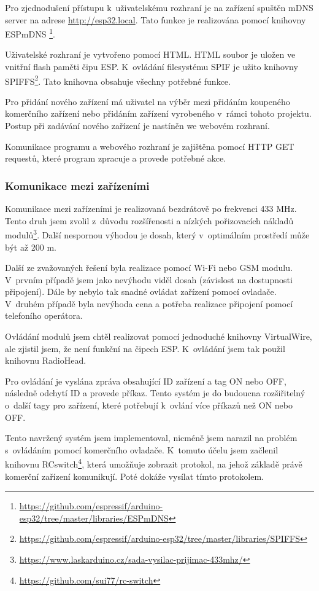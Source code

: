 \documentclass[11pt,a4paper,twoside,openright]{report}
\begin{document}
	
	Pro zjednodušení přístupu k~uživatelskému rozhraní je na zařízení spuštěn mDNS server na adrese \url{http://esp32.local}. Tato funkce je realizována pomocí knihovny ESPmDNS \footnote{\url{https://github.com/espressif/arduino-esp32/tree/master/libraries/ESPmDNS}}.
	
	
	Uživatelské rozhraní je vytvořeno pomocí HTML. HTML soubor je uložen ve vnitřní flash paměti čipu ESP. K~ovládání filesystému SPIF je užito knihovny SPIFFS\footnote{\url{https://github.com/espressif/arduino-esp32/tree/master/libraries/SPIFFS}}. Tato knihovna obsahuje všechny potřebné funkce.
	
	
	Pro přidání nového zařízení má uživatel na výběr mezi přidáním koupeného komerčního zařízení nebo přidáním zařízení vyrobeného v~rámci tohoto projektu. Postup při zadávání nového zařízení je nastíněn we webovém rozhraní.
	
	
	Komunikace programu a webového rozhraní je zajištěna pomocí HTTP GET requestů, které program zpracuje a provede potřebné akce. 
	
	
	\subsubsection{Komunikace mezi zařízeními}
	
	Komunikace mezi zařízeními je realizovaná bezdrátově po frekvenci 433 MHz. Tento druh jsem zvolil z~důvodu rozšířenosti a nízkých pořizovacích nákladů modulů\footnote{\url{https://www.laskarduino.cz/sada-vysilac-prijimac-433mhz/}}. Další nespornou výhodou je dosah, který v~optimálním prostředí může být až 200 m.
	
	
	Další ze zvažovaných řešení byla realizace pomocí Wi-Fi nebo GSM modulu. V~prvním případě jsem jako nevýhodu viděl dosah (závislost na dostupnosti připojení). Dále by nebylo tak snadné ovládat zařízení pomocí ovladače. V~druhém případě byla nevýhoda cena a potřeba realizace připojení pomocí telefoního operátora.
	
	
	Ovládání modulů jsem chtěl realizovat pomocí jednoduché knihovny VirtualWire, ale zjistil jsem, že není funkční na čipech ESP. K~ovládání jsem tak použil knihovnu RadioHead. 
	
	
	Pro ovládání  je vyslána zpráva obsahující ID zařízení a tag ON nebo OFF,  následně odchytí ID a provede příkaz. Tento systém je do budoucna rozšiřitelný o~další tagy pro zařízení, které potřebují k~ovlání více příkazů než ON nebo OFF.
	
	
	Tento navržený systém jsem implementoval, nicméně jsem narazil na problém s~ovládáním pomocí komerčního ovladače. K~tomuto účelu jsem začlenil knihovnu RCswitch\footnote{\url{https://github.com/sui77/rc-switch}}, která umožňuje zobrazit protokol, na jehož základě právě komerční zařízení komunikují. Poté dokáže vysílat tímto protokolem. 
	
\end{document}
